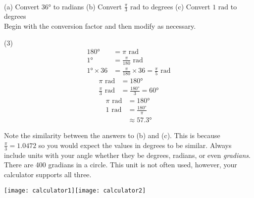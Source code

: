 \example\medskip\\
(a) Convert \ang{36} to radians\hspace{0.7cm} 
(b) Convert $\displaystyle\frac{\pi }{3}$ $\mbox{rad}$ to degrees \hspace{0.7cm} 
(c) Convert $1$ $\mbox{rad}$ to degrees \medskip\\

\solution Begin with the conversion factor and then modify as necessary.
\begin{tasks}[before-skip = {0ex} , after-skip={-5ex}](3)
\task \begin{align*}\ang{180}  &  =  \pi \text{ rad} \\
\ang{1}  &  =  \frac{\pi }{180}\text{ rad} \\
\ang{1} \times 36 &  =  \frac{\pi }{180} \times 36 =\frac{\pi }{5}\text{ rad}\end{align*}
\task
\begin{align*}\pi  \text{ rad} &  =  \ang{180}  \\
\frac{\pi }{3} \text{ rad} &  = \frac{\ang{180} }{3} =\ang{60} \end{align*}
\task
\begin{align*}\pi  \text{ rad} &  =  \ang{180} \\
1 \text{ rad} &  =  \frac{\ang{180} }{\pi } \\
 &  \approx   \ang{57.3} \end{align*}
\end{tasks}
Note the similarity between the answers to (b) and (c). This is because $\frac{\pi }{3} =1.0472$ so you would expect the values in degrees to be similar. Always include units with your angle whether they be degrees, radians, or even \textit{gradians}. There are 400 gradians in a circle. This unit is not often used, however, your calculator supports all three.\\
\begin{center}\texttt{[image: calculator1]}\hspace{1cm}\texttt{[image: calculator2]}\end{center}

